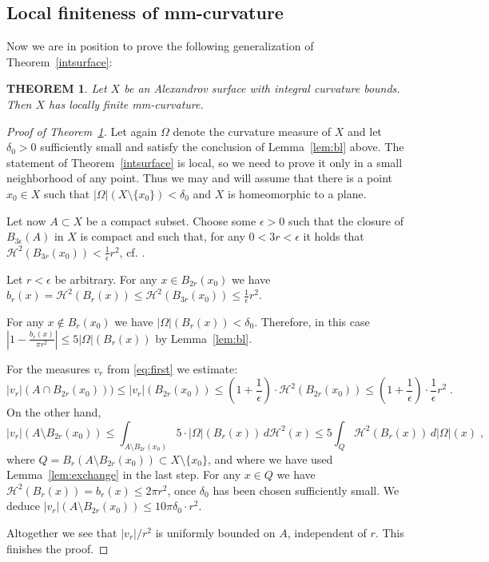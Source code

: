 \documentclass[12pt,leqno,intlimits]{amsart}
\numberwithin{equation}{section}
\newtheorem{thm}{THEOREM}[section]
\theoremstyle{definition}
\theoremstyle{remark}
\newcommand{\tref}[1]{Theorem~\ref{#1}}
\newcommand{\lref}[1]{Lemma~\ref{#1}}
\begin{document}
 \subsection{Local finiteness of mm-curvature}
 Now we are in position to prove
 the following generalization of  \tref{intsurface}:
 \begin{thm}\label{intsurface1}
 Let $X$ be an Alexandrov surface with integral curvature bounds.  Then $X$ has locally finite mm-curvature.
  \end{thm}
 \begin{proof}[Proof of \tref{intsurface1}]
 Let again $\Omega$ denote the curvature measure of $X$ and let $\delta _0>0$ sufficiently small and satisfy the conclusion of  \lref{lem:bl} above.
 The statement  of \tref{intsurface} is local, so we need to prove it only in a small neighborhood of any point.
 Thus we may and will assume that there is a point $x_0\in X$
 such that $| \Omega| (X \setminus  \{ x_0 \} )< \delta _0$ and  $X$ is homeomorphic to a plane.



  Let now $A\subset X$  be a compact subset. Choose some $\epsilon >0$ such that the closure of  $B_{3\epsilon} (A)$ in $X$ is compact and such that,
  for any $0<3r<\epsilon$ it holds that  $\mathcal H^2 (B_{3r}(x_0)) < \frac 1 {\epsilon} r^2$, cf. \cite[Lemma 8.1.1]{Reshetnyak-GeomIV}.

 Let  $r<\epsilon$    be arbitrary.
 For any $x\in B_{2r} (x_0)$ we have $b_r (x)  =\mathcal H^2 (B_r (x)) \leq \mathcal H^2 (B_{3r} (x_0)) \leq \frac 1 {\epsilon} r^2 $.


For any $x\notin B_{r} (x_0)$ we have $| \Omega |(B_r (x)) < \delta _0$. Therefore, in this case  $|1-\frac {b_r(x)}  {\pi r^2} | \leq 5 |\Omega | ( B_{r} (x))$ by Lemma~\ref{lem:bl}.

For the measures $v_r$ from \eqref{eq:first} we estimate:
 $$|v_r| (A\cap B_{2r} (x_0))) \leq |v_r| (B_{2r} (x_0))  \leq (1+ \frac 1 {\epsilon}) \cdot \mathcal H^2 (B_{2r} (x_0)) \leq
 (1+ \frac 1 {\epsilon}) \cdot \frac 1 {\epsilon} r^2 \; .$$
On the other hand,
$$|v_r| (A\setminus B_{2r} (x_0)) \leq \int _{A\setminus B_{2r} (x_0)} 5 \cdot |\Omega| (B_r (x)) \, d\mathcal H^2 (x) \leq 5 \int _Q \mathcal H^2 (B_r(x))  \, d|\Omega | (x) \; ,$$
where $Q=B_r(A\setminus B_{2r} (x_0)) \subset X\setminus \{ x_0 \}$, and where we have used \lref{lem:exchange} in the last step.
 For any $x\in Q$ we have $\mathcal H^2 (B_r(x))  =b_r (x) \leq 2\pi  r^2$, once $\delta _0$ has been chosen sufficiently small.
We deduce $|v_r| (A\setminus B_{2r} (x_0)) \leq 10 \pi \delta _0 \cdot r^2$.

Altogether we see that $|v_r| /r^2$ is uniformly bounded on $A$, independent of $r$.  This finishes the proof.
\end{proof}
\end{document}
